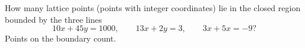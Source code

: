 How many lattice points (points with integer coordinates) lie in the closed region bounded by the three lines
\[10x+45y=1000,\qquad 13x+2y=3,\qquad 3x+5x=-9?\]
Points on the boundary count.

